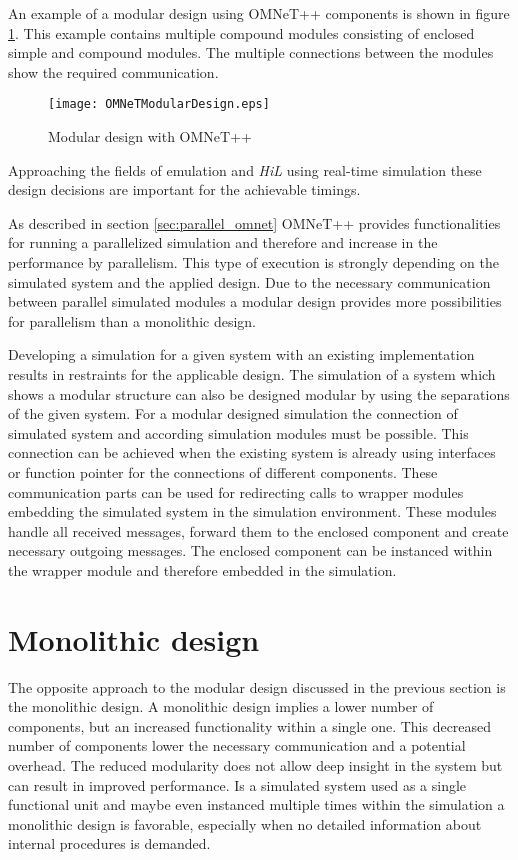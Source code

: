 An example of a modular design using OMNeT++ components is shown in figure \ref{fig:OMNeTModularDesign}.
This example contains multiple compound modules consisting of enclosed simple and compound modules.
The multiple connections between the modules show the required communication.

\begin{figure}
    \centering
    \texttt{[image: OMNeTModularDesign.eps]}
    \caption{Modular design with OMNeT++}
    \label{fig:OMNeTModularDesign}
\end{figure}

Approaching the fields of emulation and \emph{HiL} using real-time simulation these design decisions are important for the achievable timings.

As described in section \ref{sec:parallel_omnet} OMNeT++ provides functionalities for running a parallelized simulation and therefore and increase in the performance by parallelism.
This type of execution is strongly depending on the simulated system and the applied design.
Due to the necessary communication between parallel simulated modules a modular design provides more possibilities for parallelism than a monolithic design.

Developing a simulation for a given system with an existing implementation results in restraints for the applicable design.
The simulation of a system which shows a modular structure can also be designed modular by using the separations of the given system.
For a modular designed simulation the connection of simulated system and according simulation modules must be possible.
This connection can be achieved when the existing system is already using interfaces or function pointer for the connections of different components.
These communication parts can be used for redirecting calls to wrapper modules embedding the simulated system in the simulation environment.
These modules handle all received messages, forward them to the enclosed component and create necessary outgoing messages.
The enclosed component can be instanced within the wrapper module and therefore embedded in the simulation.

\section{Monolithic design}
\label{sec:design_monolithic}
The opposite approach to the modular design discussed in the previous section is the monolithic design.
A monolithic design implies a lower number of components, but an increased functionality within a single one.
This decreased number of components lower the necessary communication and a potential overhead.
The reduced modularity does not allow deep insight in the system but can result in improved performance.
Is a simulated system used as a single functional unit and maybe even instanced multiple times within the simulation a monolithic design is favorable, especially when no detailed information about internal procedures is demanded.

